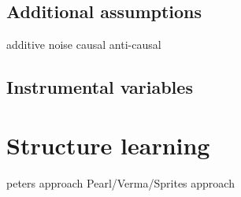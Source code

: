 \documentclass[11pt,a4paper]{article}
\begin{document}
\subsection{Additional assumptions}
additive noise
causal anti-causal \cite{Janzing2012}

\subsection{Instrumental variables}


\section{Structure learning}
peters approach \cite{Peters2014}
Pearl/Verma/Sprites approach \cite{Pearl2000} 




\end{document}
